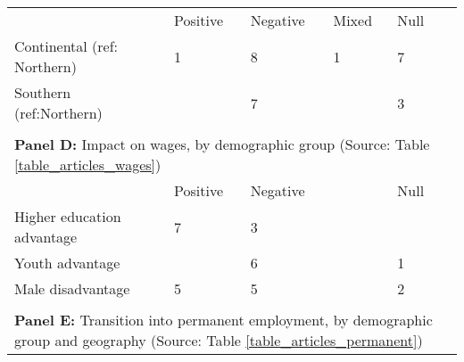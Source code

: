 \begin{tabular}{llllll}
                     \phantom{Column1} & Positive     & Negative      & Mixed             & Null  & \phantom{Source} \\ \cmidrule(lr){2-5}Continental (ref: Northern) & 1 & 8 & 1 & 7 &  \\ 
  Southern (ref:Northern) &  & 7 &  & 3 &  \\ 
   \hline \\[-1.8ex]   
                     \multicolumn{6}{l}{{\bf Panel D:} Impact on wages, by demographic group (Source: Table \ref{table_articles_wages})} \\ 

                     \phantom{Column1} & Positive     & Negative      & \phantom{Mixed}  & Null  & \phantom{Source} \\ \cmidrule(lr){2-5}Higher education advantage & 7 & 3 &  &  &  \\ 
  Youth advantage &  & 6 &  & 1 &  \\ 
  Male disadvantage & 5 & 5 &  & 2 &  \\ 
   \hline \\[-1.8ex]   
                     \multicolumn{6}{l}{{\bf Panel E:} Transition into permanent employment, by demographic group and geography (Source: Table \ref{table_articles_permanent})} \\ 


\end{tabular}
